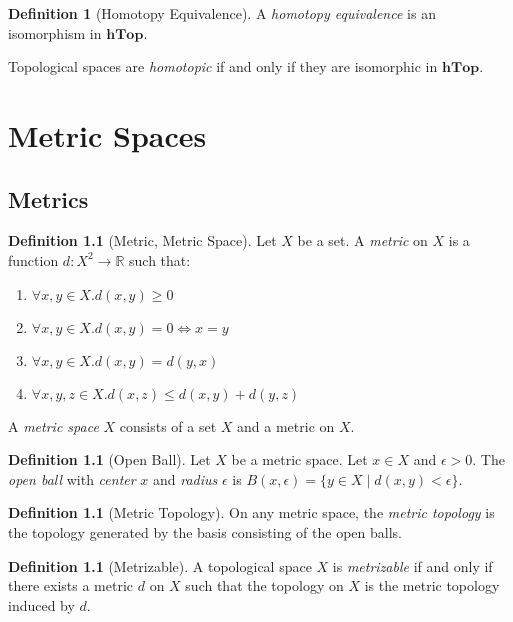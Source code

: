 \documentclass{book}
\theoremstyle{definition}
\newtheorem{definition}[lemma]{Definition}
\newcommand{\Real}{\ensuremath{\mathbb{R}}}
\begin{document}
\begin{definition}[Homotopy Equivalence]
    A \emph{homotopy equivalence} is an isomorphism in $\mathbf{hTop}$.

    Topological spaces are \emph{homotopic} if and only if they are isomorphic in $\mathbf{hTop}$.
\end{definition}

\chapter{Metric Spaces}

\section{Metrics}

\begin{definition}[Metric, Metric Space]
    Let $X$ be a set. A \emph{metric} on $X$ is a function $d : X^2 \rightarrow \Real$ such that:
    \begin{enumerate}
        \item $\forall x,y \in X. d(x,y) \geq 0$
        \item $\forall x,y \in X. d(x,y) = 0 \Leftrightarrow x = y$
        \item $\forall x,y \in X. d(x,y) = d(y,x)$
        \item $\forall x,y,z \in X. d(x,z) \leq d(x,y) + d(y,z)$
    \end{enumerate}

    A \emph{metric space} $X$ consists of a set $X$ and a metric on $X$.
\end{definition}

\begin{definition}[Open Ball]
    Let $X$ be a metric space. Let $x \in X$ and $\epsilon > 0$. The \emph{open ball} with \emph{center} $x$
    and \emph{radius} $\epsilon$ is $B(x, \epsilon) = \{ y \in X \mid d(x,y) < \epsilon \}$.
\end{definition}

\begin{definition}[Metric Topology]
    On any metric space, the \emph{metric topology} is the topology generated by the basis consisting of the open balls.
\end{definition}

\begin{definition}[Metrizable]
    A topological space $X$ is \emph{metrizable} if and only if there exists a metric $d$ on $X$ such that the topology on $X$
    is the metric topology induced by $d$.
\end{definition}
\end{document}

